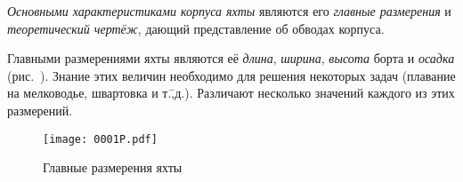 \textit{Основными характеристиками
корпуса яхты} являются его \textit{главные размерения}
и \textit{теоретический чертёж}, дающий
представление об обводах корпуса.

Главными размерениями яхты являются её \textit{длина},
\textit{ширина},
\textit{высота} борта и
\textit{осадка} (рис.~). Знание этих
величин необходимо для решения некоторых задач (плавание на
мелководье, швартовка и т.\=,д.). Различают несколько значений каждого
из этих размерений.

\begin{figure*}[!htb]
   \centering
   \texttt{[image: 0001P.pdf]}
   \caption{Главные размерения яхты}
   \label{fig:1}
\end{figure*}

